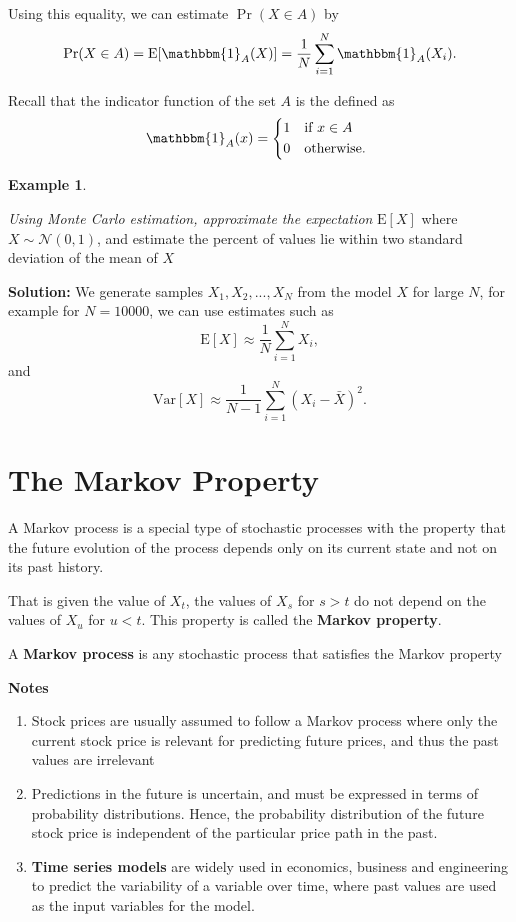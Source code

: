 \documentclass[
]{book}
\theoremstyle{definition}
\theoremstyle{definition}
\newtheorem{example}{Example}[chapter]
\theoremstyle{definition}
\theoremstyle{definition}
\theoremstyle{remark}
\begin{document}
Using this equality, we can estimate \(\Pr(X \in A)\) by
\[\Pr(X \in A) = \mathrm{E}[\mathbbm{1}_A(X)] = \frac{1}{N}\sum_{i=1}^N \mathbbm{1}_A(X_i).\]

Recall that the indicator function of the set \(A\) is the defined as
\[\mathbbm{1}_A(x) =
\begin{cases*}
     1          & if $x \in A $ \\
      0        & otherwise.
\end{cases*}\]

\begin{example}
\protect\hypertarget{exm:unlabeled-div-73}{}\label{exm:unlabeled-div-73}

\emph{Using Monte Carlo estimation, approximate the expectation}
\(\mathrm{E}[X]\) where \(X \sim \mathcal{N}(0,1)\), and estimate the
percent of values lie within two standard deviation of the mean of \(X\)

\end{example}

\textbf{Solution:} We generate samples \(X_1,X_2,...,X_N\) from the model \(X\)
for large \(N\), for example for \(N = 10000\), we can use estimates such as
\[\mathrm{E}[X] \approx \frac{1}{N}\sum_{i=1}^N X_i,\] and
\[\mathrm{Var}[X] \approx \frac{1}{N-1}\sum_{i=1}^N (X_i - \bar{X})^2.\]

\hypertarget{the-markov-property}{%
\section{The Markov Property}\label{the-markov-property}}

A Markov process is a special type of stochastic processes with the
property that the future evolution of the process depends only on its
current state and not on its past history.

That is given the value of \(X_t\), the values of \(X_s\) for \(s > t\) do not
depend on the values of \(X_u\) for \(u < t\). This property is called the
\textbf{Markov property}.

A \textbf{Markov process} is any stochastic process that satisfies the Markov
property

\textbf{Notes}

\begin{enumerate}
\def\labelenumi{\arabic{enumi}.}
\item
  Stock prices are usually assumed to follow a Markov process where
  only the current stock price is relevant for predicting future
  prices, and thus the past values are irrelevant
\item
  Predictions in the future is uncertain, and must be expressed in
  terms of probability distributions. Hence, the probability
  distribution of the future stock price is independent of the
  particular price path in the past.
\item
  \textbf{Time series models} are widely used in economics, business and
  engineering to predict the variability of a variable over time,
  where past values are used as the input variables for the model.
\end{enumerate}
\end{document}
